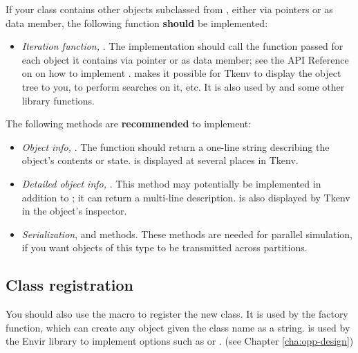If your class contains other objects subclassed from ,
either via pointers or as data member, the following function \textbf{should}
be implemented:

\begin{itemize}
  \item{\textit{Iteration function,} .
        The implementation should call the function passed
        for each object it contains via pointer or as data member;
        see the API Reference on  on how to implement
        .  makes it possible
        for Tkenv to display the object tree to you, to perform searches on it, etc.
        It is also used by  and some other library functions.}
\end{itemize}

The following methods are \textbf{recommended} to implement:

\begin{itemize}
  \item{\textit{Object info,} . The  function
        should return a one-line string describing the object's contents or state.
         is displayed at several places in Tkenv.}
  \item{\textit{Detailed object info,} .
        This method may potentially be implemented in addition to ;
        it can return a multi-line description.  is also
        displayed by Tkenv in the object's inspector.}
  \item{\textit{Serialization},  and  methods.
        These methods are needed for parallel simulation, if you want
        objects of this type to be transmitted across partitions.}
\end{itemize}


\subsection{Class registration}

You should also use the  macro to register the
new class. It is used by the  factory function, which can
create any object given the class name as a string. 
is used by the Envir library to implement  options
such as  or .
(see Chapter \ref{cha:opp-design})


